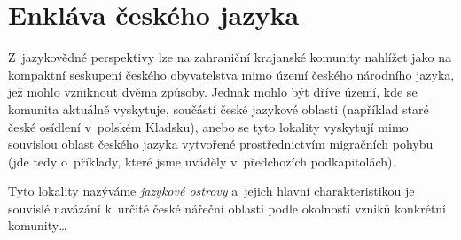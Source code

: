 \hypertarget{enkluxe1va-ux10deskuxe9ho-jazyka}{%
\section{Enkláva českého jazyka}\label{enkluxe1va-ux10deskuxe9ho-jazyka}}

Z~jazykovědné perspektivy lze na zahraniční krajanské komunity nahlížet jako na kompaktní seskupení českého obyvatelstva mimo území českého národního jazyka, jež mohlo vzniknout dvěma způsoby. Jednak mohlo být dříve území, kde se komunita aktuálně vyskytuje, součástí české jazykové oblasti (například staré české osídlení v~polském Kladsku), anebo se tyto lokality vyskytují mimo souvislou oblast českého jazyka vytvořené prostřednictvím migračních pohybu (jde tedy o~příklady, které jsme uváděly v~předchozích podkapitolách).

Tyto lokality nazýváme \emph{jazykové ostrovy} a~jejich hlavní charakteristikou je souvislé navázání k~určité české nářeční oblasti podle okolností vzniků konkrétní komunity\ldots{}
